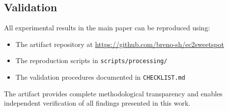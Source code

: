 \documentclass[conference]{IEEEtran}
\begin{document}
\subsection{Validation}

All experimental results in the main paper can be reproduced using:
\begin{itemize}
	\item The artifact repository at \url{https://github.com/breno-sh/ec2sweetspot}
	\item The reproduction scripts in \texttt{scripts/processing/}
	\item The validation procedures documented in \texttt{CHECKLIST.md}
\end{itemize}

The artifact provides complete methodological transparency and enables independent verification of all findings presented in this work.
	
\end{document}
